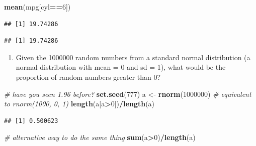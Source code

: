 \documentclass[]{book}
\newenvironment{Shaded}{\begin{snugshade}}{\end{snugshade}}
\newcommand{\CommentTok}[1]{\textcolor[rgb]{0.56,0.35,0.01}{\textit{#1}}}
\newcommand{\DecValTok}[1]{\textcolor[rgb]{0.00,0.00,0.81}{#1}}
\newcommand{\KeywordTok}[1]{\textcolor[rgb]{0.13,0.29,0.53}{\textbf{#1}}}
\newcommand{\NormalTok}[1]{#1}
\newcommand{\OperatorTok}[1]{\textcolor[rgb]{0.81,0.36,0.00}{\textbf{#1}}}
\newcommand{\StringTok}[1]{\textcolor[rgb]{0.31,0.60,0.02}{#1}}
\providecommand{\tightlist}{%
  \setlength{\itemsep}{0pt}\setlength{\parskip}{0pt}}
\begin{document}
\begin{Shaded}
\begin{Highlighting}[]
\KeywordTok{mean}\NormalTok{(mpg[cyl}\OperatorTok{==}\DecValTok{6}\NormalTok{])}
\end{Highlighting}
\end{Shaded}

\begin{verbatim}
## [1] 19.74286
\end{verbatim}

\begin{Shaded}
\end{Shaded}

\begin{verbatim}
## [1] 19.74286
\end{verbatim}

\begin{enumerate}
\def\labelenumi{\arabic{enumi}.}
\setcounter{enumi}{5}
\tightlist
\item
  Given the 1000000 random numbers from a standard normal distribution (a normal distribution with mean = 0 and sd = 1), what would be the proportion of random numbers greater than 0?
\end{enumerate}

\begin{Shaded}
\begin{Highlighting}[]
\CommentTok{# have you seen 1.96 before?}
\KeywordTok{set.seed}\NormalTok{(}\DecValTok{777}\NormalTok{)}
\NormalTok{a <-}\StringTok{ }\KeywordTok{rnorm}\NormalTok{(}\DecValTok{1000000}\NormalTok{) }\CommentTok{# equivalent to rnorm(1000, 0, 1)}
\KeywordTok{length}\NormalTok{(a[a}\OperatorTok{>}\DecValTok{0}\NormalTok{])}\OperatorTok{/}\KeywordTok{length}\NormalTok{(a)}
\end{Highlighting}
\end{Shaded}

\begin{verbatim}
## [1] 0.500623
\end{verbatim}

\begin{Shaded}
\begin{Highlighting}[]
\CommentTok{# alternative way to do the same thing}
\KeywordTok{sum}\NormalTok{(a}\OperatorTok{>}\DecValTok{0}\NormalTok{)}\OperatorTok{/}\KeywordTok{length}\NormalTok{(a)}
\end{Highlighting}
\end{Shaded}
\end{document}
